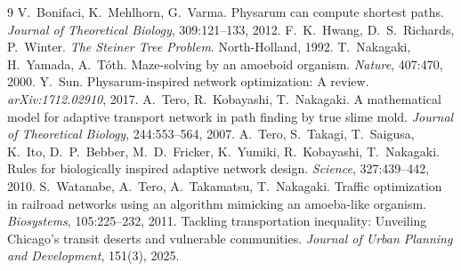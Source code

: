 \documentclass[11pt]{article}
\begin{document}
\small
\begin{thebibliography}{9}
 V.~Bonifaci, K.~Mehlhorn, G.~Varma.
Physarum can compute shortest paths. \emph{Journal of Theoretical Biology}, 309:121--133, 2012.
 F.~K.~Hwang, D.~S.~Richards, P.~Winter.
\emph{The Steiner Tree Problem}. North-Holland, 1992.
 T.~Nakagaki, H.~Yamada, A.~T\'oth.
Maze-solving by an amoeboid organism. \emph{Nature}, 407:470, 2000.
 Y.~Sun. Physarum-inspired network optimization: A review.
\emph{arXiv:1712.02910}, 2017.
 A.~Tero, R.~Kobayashi, T.~Nakagaki.
A mathematical model for adaptive transport network in path finding by true slime mold.
\emph{Journal of Theoretical Biology}, 244:553--564, 2007.
 A.~Tero, S.~Takagi, T.~Saigusa, K.~Ito, D.~P.~Bebber,
M.~D.~Fricker, K.~Yumiki, R.~Kobayashi, T.~Nakagaki. Rules for biologically inspired adaptive
network design. \emph{Science}, 327:439--442, 2010.
 S.~Watanabe, A.~Tero, A.~Takamatsu, T.~Nakagaki.
Traffic optimization in railroad networks using an algorithm mimicking an amoeba-like organism.
\emph{Biosystems}, 105:225--232, 2011.
 Tackling transportation inequality:
Unveiling Chicago's transit deserts and vulnerable communities. \emph{Journal of Urban Planning
and Development}, 151(3), 2025.
\end{thebibliography}
\end{document}
